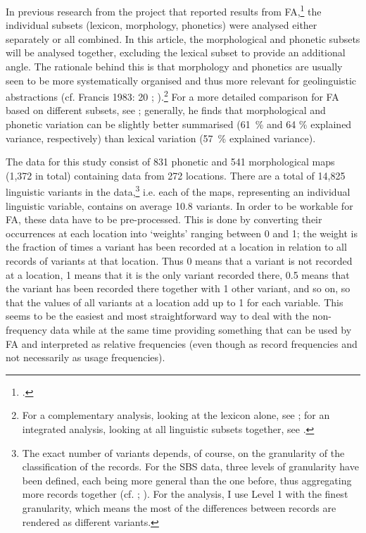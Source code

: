 \documentclass[output=paper]{LSP/langsci}
\begin{document}
In previous research from the project that reported results from FA,\footnote{\cite{pickl_probabilistische_2013,pickl_verdichtungen_2013,buhler_dialektraume_2014,proll_raumvariation_2015,proll_raumvariation_2015}.} the individual subsets (lexicon, morphology, phonetics) were analysed either separately or all combined. In this article, the morphological and phonetic subsets will be analysed together, excluding the lexical subset to provide an additional angle. The rationale behind this is that morphology and phonetics are usually seen to be more systematically organised and thus more relevant for geolinguistic abstractions (cf. Francis 1983: 20 %
; \citealt[41, 119]{labov_atlas_2006-1}).\footnote{For a complementary analysis, looking at the lexicon alone, see \citet{pickl_probabilistische_2013,pickl_verdichtungen_2013}; for an integrated analysis, looking at all linguistic subsets together, see \citet{proll_raumvariation_2015}.} For a more detailed comparison for FA based on different subsets, see \citet[84--132]{proll_raumvariation_2015}; generally, he finds that morphological and phonetic variation can be slightly better summarised (61~\% and 64 \% explained variance, respectively) than lexical variation (57~\% explained variance).

The data for this study consist of 831 phonetic and 541 morphological maps (1,372 in total) containing data from 272 locations. There are a total of 14,825 linguistic variants in the data,\footnote{The exact number of variants depends, of course, on the granularity of the classification of the records. For the SBS data, three levels of granularity have been defined, each being more general than the one before, thus aggregating more records together (cf. \citealt[75--78]{pickl_probabilistische_2013}; \citealt[47--48]{proll_raumvariation_2015}). For the analysis, I use Level 1 with the finest granularity, which means the most of the differences between records are rendered as different variants.} i.e. each of the maps, representing an individual linguistic variable, contains on average 10.8 variants. In order to be workable for FA, these data have to be pre-processed. This is done by converting their occurrences at each location into ‘weights’ ranging between 0 and 1; the weight is the fraction of times a variant has been recorded at a location in relation to all records of variants at that location. Thus 0 means that a variant is not recorded at a location, 1 means that it is the only variant recorded there, 0.5 means that the variant has been recorded there together with 1 other variant, and so on, so that the values of all variants at a location add up to 1 for each variable. This seems to be the easiest and most straightforward way to deal with the non-frequency data while at the same time providing something that can be used by FA and interpreted as relative frequencies (even though as record frequencies and not necessarily as usage frequencies). 
\end{document}
